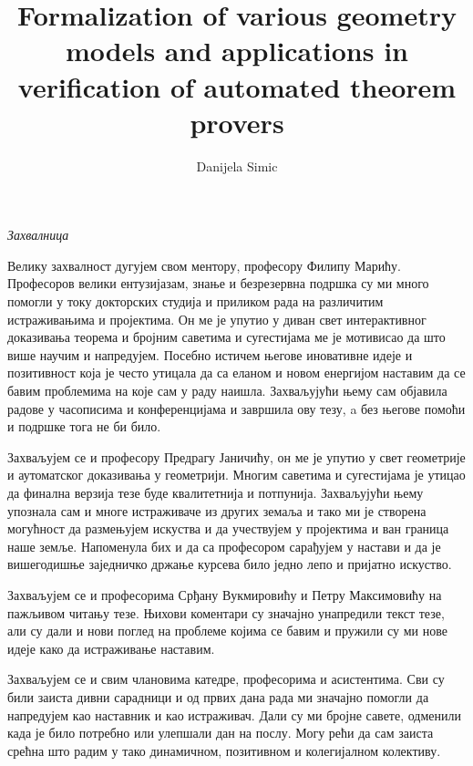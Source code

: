 \documentclass[a4paper,12pt,oneside]{memoir}
\author{Danijela Simic}
\title{Formalization of various geometry models and applications in verification of automated theorem provers}
\begin{document}
\frontmatter
\naslovna
\naslovnaen
\komisija

\newpage

\begin{Huge}
\emph{Захвалница}
\end{Huge}

\bigskip
\bigskip


Велику захвалност дугујем свом ментору, професору Филипу
Марићу. Професоров велики ентузијазам, знање и безрезервна подршка су
ми много помогли у току докторских студија и приликом рада на
различитим истраживањима и пројектима. Он ме је упутио у диван свет
интерактивног доказивања теорема и бројним саветима и сугестијама ме
је мотивисао да што више научим и напредујем. Посебно истичем његове
иновативне идеје и позитивност која је често утицала да са еланом и
новом енергијом наставим да се бавим проблемима на које сам у раду
наишла. Захваљујући њему сам објавила радове у часописима и
конференцијама и завршила ову тезу, a без његове помоћи и подршке тога
не би било.

Захваљујем се и професору Предрагу Јаничићу, он ме је упутио у свет
геометрије и аутоматског доказивања у геометрији. Многим саветима и
сугестијама је утицао да финална верзија тезе буде квалитетнија и
потпунија. Захваљујући њему упознала сам и многе истраживаче из других
земаља и тако ми је створена могућност да размењујем искуства и да
учествујем у пројектима и ван граница наше земље. Напоменула бих и да
са професором сарађујем у настави и да је вишегодишње заједничко
држање курсева било једно лепо и пријатно искуство.

Захваљујем се и професорима Срђану Вукмировићу и Петру Максимовићу на
пажљивом читању тезе. Њихови коментари су значајно унапредили текст
тезе, али су дали и нови поглед на проблеме којима се бавим и пружили
су ми нове идеје како да истраживање наставим.

Захваљујем се и свим члановима катедре, професорима и асистентима. Сви
су били заиста дивни сарадници и од првих дана рада ми значајно
помогли да напредујем као наставник и као истраживач. Дали су ми
бројне савете, одменили када је било потребно или улепшали дан на
послу. Могу рећи да сам заиста срећна што радим у тако динамичном,
позитивном и колегијалном колективу.
\end{document}
